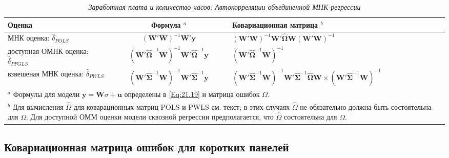 \begin{table}[ht]
\caption{{\it Заработная плата и количество часов: Автокорреляции объединенной МНК-регрессии}} 
\centering
\begin{tabular}{p{4.5cm} c p{4cm}}
\hline \hline
	Оценка & Формула ${}^a$ & Ковариационная матрица	${}^b$ \\
\hline
МНК оценка: $\hat{\delta}_{POLS}$ & $(\mathbf W' \mathbf W)^{-1} \mathbf W' \mathbf y$ & $(\mathbf W' \mathbf W)^{-1} \mathbf W' \hat{\bm\Omega} \mathbf W (\mathbf W' \mathbf W)^{-1}$ \\
доступная ОМНК оценка: $\hat{\delta}_{PFGLS}$& $(\mathbf W' \hat{\bm\Omega}^{-1} \mathbf W)^{-1} \mathbf W' \hat{\bm\Omega}^{-1} \mathbf y$ &  $(\mathbf W' \hat{\bm\Omega}^{-1} \mathbf W)^{-1}$\\
взвешеная МНК оценка:  $\hat{\delta}_{PWLS}$ & $(\mathbf W' \hat{\bm\Sigma}^{-1} \mathbf W)^{-1} \mathbf W' \hat{\bm\Sigma}^{-1} \mathbf y$ & $(\mathbf W' \hat{\bm\Sigma}^{-1} \mathbf W)^{-1} \mathbf W' \hat{\bm\Sigma}^{-1} \hat{\bm\Omega} \mathbf W \times (\mathbf W' \hat{\bm\Sigma}^{-1} \mathbf W)^{-1}$  \\
\hline \hline
\multicolumn{3}{p{15cm}}{${}^a$ Формулы для модели $\mathbf y =\mathbf W \sigma + \mathbf u$ определены в \ref{Eq:21.19} и матрица ошибок $\Omega$.} \\
\multicolumn{3}{p{15cm}}{${}^b$ Для вычисления $\hat{\Omega}$ для коварационных матриц POLS и PWLS см. текст; в этих случаях $\hat{\Omega}$ не обязательно должна быть состоятельна для $\Omega$. Для 
доступной ОММ оценки модели сквозной регрессии предполагается, что $\hat{\Omega}$ состоятельна для $\Omega$.}
\end{tabular}
\label{Tab:21.5}
\end{table}

\subsection{Ковариационная матрица ошибок для коротких панелей}

